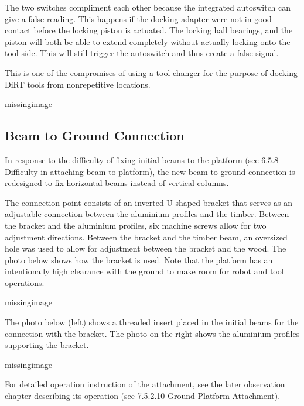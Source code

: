 The two switches compliment each other because the integrated autoswitch can give a false reading. This happens if the docking adapter were not in good contact before the locking piston is actuated. The locking ball bearings, and the piston will both be able to extend completely without actually locking onto the tool-side. This will still trigger the autoswitch and thus create a false signal. 

This is one of the compromises of using a tool changer for the purpose of docking DiRT tools from nonrepetitive locations. 

missingimage

\subsection{Beam to Ground Connection}
In response to the difficulty of fixing initial beams to the platform (see 6.5.8 Difficulty in attaching beam to platform), the new beam-to-ground connection is redesigned to fix horizontal beams instead of vertical columns. 

The connection point consists of an inverted U shaped bracket that serves as an adjustable connection between the aluminium profiles and the timber. Between the bracket and the aluminium profiles, six machine screws allow for two adjustment directions. Between the bracket and the timber beam, an oversized hole was used to allow for adjustment between the bracket and the wood. The photo below shows how the bracket is used. Note that the platform has an intentionally high clearance with the ground to make room for robot and tool operations.

missingimage

The photo below (left) shows a threaded insert placed in the initial beams for the connection with the bracket. The photo on the right shows the aluminium profiles supporting the bracket.

missingimage

For detailed operation instruction of the attachment, see the later observation chapter describing its operation (see 7.5.2.10 Ground Platform Attachment). 

